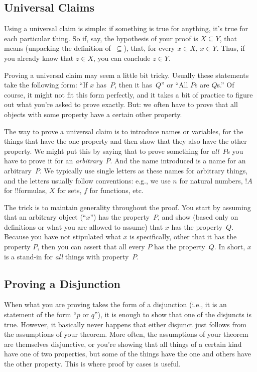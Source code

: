 \documentclass[../../../include/open-logic-section]{subfiles}
\begin{document}
\subsection{Universal Claims}

Using a universal claim is simple: if something is true for anything,
it's true for each particular thing.  So if, say, the hypothesis of
your proof is $X \subseteq Y$, that means (unpacking the definition
of~$\subseteq$), that, for every $x \in X$, $x \in Y$. Thus, if you
already know that $z \in X$, you can conclude $z \in Y$.

Proving a universal claim may seem a little bit tricky. Usually these
statements take the following form: ``If $x$ has~$P$, then it
has~$Q$'' or ``All $P$s are $Q$s.'' Of course, it might not fit this
form perfectly, and it takes a bit of practice to figure out what
you're asked to prove exactly. But: we often have to prove that all objects
with some property have a certain other property.

The way to prove a universal claim is to introduce names or variables,
for the things that have the one property and then show that they also
have the other property.  We might put this by saying that to prove
something for \emph{all}~$P$s you have to prove it for an
\emph{arbitrary}~$P$. And the name introduced is a name for an
arbitrary~$P$.  We typically use single letters as these names for
arbitrary things, and the letters usually follow conventions: e.g., we
use $n$ for natural numbers, $!A$ for !!{formula}s, $X$ for sets, $f$
for functions, etc.

The trick is to maintain generality throughout the proof. You start by
assuming that an arbitrary object (``$x$'') has the property~$P$, and
show (based only on definitions or what you are allowed to assume)
that $x$ has the property~$Q$. Because you have not stipulated what
$x$ is specifically, other that it has the property $P$, then you can
assert that all every $P$ has the property~$Q$. In short, $x$ is a
stand-in for \emph{all} things with property~$P$.

\subsection{Proving a Disjunction}

When what you are proving takes the form of a disjunction (i.e., it is
an statement of the form ``$p$ or $q$''), it is enough to show that
one of the disjuncts is true.  However, it basically never happens
that either disjunct just follows from the assumptions of your
theorem. More often, the assumptions of your theorem are themselves
disjunctive, or you're showing that all things of a certain kind have
one of two properties, but some of the things have the one and others
have the other property.  This is where proof by cases is
useful.
\end{document}
